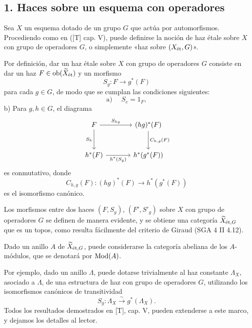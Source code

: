 \subsection*{1. Haces sobre un esquema con operadores}

Sea $X$ un esquema dotado de un grupo $G$ que actúa por automorfismos. Procediendo como en ([T] cap. V), puede definirse la noción de haz étale sobre $X$ con grupo de operadores $G$, o simplemente «haz sobre $(X_{\mathrm{\acute{e}t}},G)$».

Por definición, dar un haz étale sobre $X$ con grupo de operadores $G$ consiste en dar un haz $F\in \operatorname{ob}(\widetilde X_{\mathrm{\acute{e}t}})$ y un morfismo
\[
S_g:F\longrightarrow g^*(F)
\]
para cada $g\in G$, de modo que se cumplan las condiciones siguientes:
\[
\text{a) }\quad S_e=1_F,
\]
b) Para $g,h\in G$, el diagrama
\[
\begin{tikzcd}[column sep=large,row sep=large]
F \arrow[r,"S_{hg}"] \arrow[d,"S_h"'] & (hg)^*(F) \arrow[d,"C_{h,g}(F)"]\\
h^*(F) \arrow[r,"h^*(S_g)"'] & h^*(g^*(F))
\end{tikzcd}
\]
es conmutativo, donde
\[
C_{h,g}(F):(hg)^*(F)\longrightarrow h^*(g^*(F))
\]
es el isomorfismo canónico.

Los morfismos entre dos haces $(F,S_g)$, $(F',S'_g)$ sobre $X$ con grupo de operadores $G$ se definen de manera evidente, y se obtiene una categoría $\widetilde X_{\mathrm{\acute{e}t},G}$ que es un topos, como resulta fácilmente del criterio de Giraud (SGA 4 II 4.12).

Dado un anillo $A$ de $\widetilde X_{\mathrm{\acute{e}t},G}$, puede considerarse la categoría abeliana de los $A$-módulos, que se denotará por $\operatorname{Mod}(A)$.

Por ejemplo, dado un anillo $\Lambda$, puede dotarse trivialmente al haz constante $\Lambda_X$, asociado a $\Lambda$, de una estructura de haz con grupo de operadores $G$, utilizando los isomorfismos canónicos de transitividad
\[
S_g:\Lambda_X\xrightarrow{\sim}g^*(\Lambda_X).
\]
Todos los resultados demostrados en [T], cap. V, pueden extenderse a este marco, y dejamos los detalles al lector.
